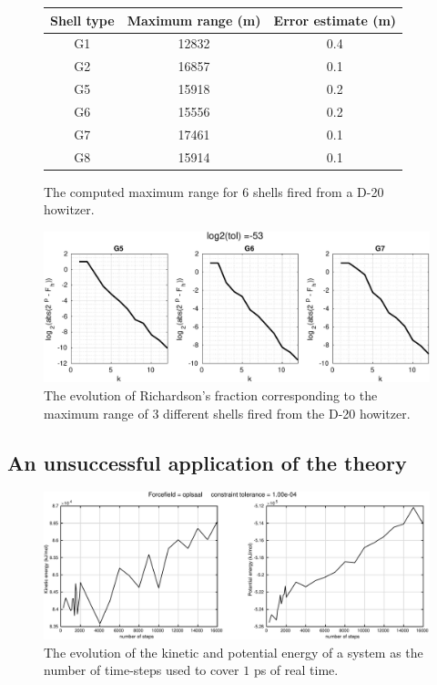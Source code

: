 \documentclass[runningheads]{llncs}
\begin{document}
\begin{figure}
  \centering
  \begin{tabular}{c|c|c}
    Shell type & Maximum range (m) & Error estimate (m) \\ \hline
    G1      &     12832    &            0.4 \\
    G2      &     16857    &            0.1 \\
    G5      &     15918    &            0.2 \\
    G6      &     15556    &            0.2 \\
    G7      &     17461    &            0.1 \\
    G8      &     15914    &            0.1 \\
  \end{tabular}
  \caption{The computed maximum range for 6 shells fired from a D-20 howitzer.}
  \label{fig:maxrange_rk1_table_tol53} 
\end{figure}

\begin{figure}[t!]
  \centering
  \includegraphics[width=\linewidth]{maxrange_rk1_tol53.pdf}
  \caption{The evolution of Richardson's fraction corresponding to the maximum range of 3 different shells fired from the D-20 howitzer.} \label{fig:maxrange_rk1_fraction_tol53}
\end{figure}

\subsection{An unsuccessful application of the theory}

\begin{figure}
  \centering
  \includegraphics[width=\linewidth]{oplsaaltol04.pdf}
  \caption{The evolution of the kinetic and potential energy of a system as the number of time-steps used to cover $1$ ps of real time.} \label{fig:oplsaaltol04}
\end{figure}
\end{document}
